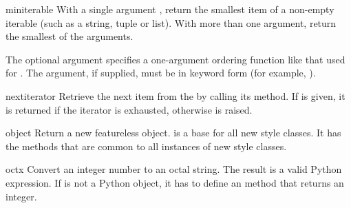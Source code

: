 \begin{funcdesc}{min}{iterable}
  With a single argument , return the smallest item of a
  non-empty iterable (such as a string, tuple or list).  With more
  than one argument, return the smallest of the arguments.

  The optional  argument specifies a one-argument ordering
  function like that used for .  The 
  argument, if supplied, must be in keyword form (for example,
  ).
\end{funcdesc}

\begin{funcdesc}{next}{iterator}
  Retrieve the next item from the  by calling its
   method.  If  is given, it is returned if the
  iterator is exhausted, otherwise  is raised.
\end{funcdesc}

\begin{funcdesc}{object}{}
  Return a new featureless object.   is a base
  for all new style classes.  It has the methods that are common
  to all instances of new style classes.

\end{funcdesc}

\begin{funcdesc}{oct}{x}
  Convert an integer number to an octal string.  The
  result is a valid Python expression.  If  is not a Python
   object, it has to define an  method
  that returns an integer.
\end{funcdesc}

